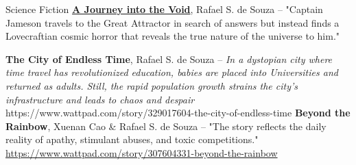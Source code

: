 \begin{rubric}{Science Fiction}
\entry*[Dec 29, 2022]%
\textbf{\href{https://www.wattpad.com/story/330564922-a-journey-into-the-void}{A Journey into the Void}}, Rafael S. de Souza -- "Captain Jameson travels to the Great Attractor in search of answers but instead finds a Lovecraftian cosmic horror that reveals the true nature of the universe to him."

%
\entry*[Dec 12, 2022]%
\textbf{The City of Endless Time}, Rafael S. de Souza -- {\it In a dystopian city where time travel has revolutionized education, babies are placed into Universities and returned as adults. Still, the rapid population growth strains the city's infrastructure and leads to chaos and despair}
https://www.wattpad.com/story/329017604-the-city-of-endless-time
%
\entry*[Apr 14, 2022]%
\textbf{Beyond the Rainbow}, Xuenan Cao \& Rafael S. de Souza -- "The story reflects the daily reality of apathy, stimulant abuses, and toxic competitions."
\url{https://www.wattpad.com/story/307604331-beyond-the-rainbow}



\end{rubric}

